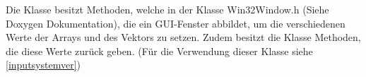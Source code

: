 Die Klasse besitzt Methoden, welche in der Klasse Win32Window.h (Siehe Doxygen Dokumentation), die ein GUI-Fenster abbildet, um die verschiedenen Werte der Arrays und des Vektors zu setzen.
Zudem besitzt die Klasse Methoden, die diese Werte zurück geben. (Für die Verwendung dieser Klasse siehe \cref{inputsystemver})